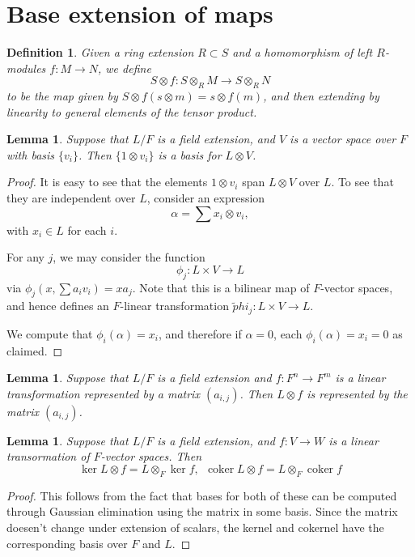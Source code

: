 \documentclass[12pt]{report}
\theoremstyle{plain}
\newtheorem{defn}[thm]{Definition}
\newtheorem{lem}[thm]{Lemma}
\newcommand{\oper}[1]{\operatorname{#1}}
\newcommand{\til}{\widetilde}
\newcommand{\coker}{\oper{coker}}
\begin{document}
\section{Base extension of maps}

\begin{defn}
Given a ring extension $R \subset S$ and a homomorphism of left $R$-modules
$f : M \to N$, we define 
\[S \otimes f : S \otimes_R M \to S \otimes_R N\]
to be the map given by $S \otimes f (s \otimes m) = s \otimes f(m)$, and
then extending by linearity to general elements of the tensor product.
\end{defn}

\begin{lem}
Suppose that $L/F$ is a field extension, and $V$ is a vector space over
$F$ with basis $\{v_i\}$. Then $\{1 \otimes v_i\}$ is a basis for $L
\otimes V$.
\end{lem}
\begin{proof}
It is easy to see that the elements $1 \otimes v_i$ span $L \otimes V$ over
$L$. To see that they are independent over $L$, consider an expression 
\[\alpha = \sum x_i \otimes v_i, \] 
with $x_i \in L$ for each $i$.

For any $j$, we may consider the function 
\[\phi_j: L \times V \to L\]
via $\phi_j(x, \sum a_i v_i) = xa_j$. Note that this is a bilinear map of
$F$-vector spaces, and hence defines an $F$-linear transformation $\til
phi_j: L \times V \to L$. 

We compute that $\phi_i(\alpha) = x_i$, and therefore if $\alpha = 0$, each
$\phi_i(\alpha) = x_i = 0$ as claimed.
\end{proof}

\begin{lem}
Suppose that $L/F$ is a field extension and $f : F^n \to F^m$ is a linear
transformation represented by a matrix $(a_{i,j})$. Then $L \otimes f$ is
represented by the matrix $(a_{i,j})$.
\end{lem}

\begin{lem} \label{scalar exact}
Suppose that $L/F$ is a field extension, and $f: V \to W$ is a linear
transormation of $F$-vector spaces. Then
\[ \ker L \otimes f = L \otimes_F \ker f, \ \ \coker L \otimes f = L
\otimes_F \coker f \]
\end{lem}
\begin{proof}
This follows from the fact that bases for both of these can be computed
through Gaussian elimination using the matrix in some basis. Since the
matrix doesen't change under extension of scalars, the kernel and cokernel
have the corresponding basis over $F$ and $L$.
\end{proof}

%
%
\printindex
\end{document}
